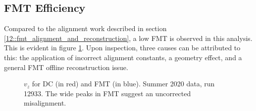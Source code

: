 \subsection{FMT Efficiency}
\label{14.10::fmt_efficiency}
    Compared to the alignment work described in section \ref{12::fmt_alignment_and_reconstruction}, a low FMT is observed in this analysis.
    This is evident in figure \ref{fig::14.10::vz_012933}.
    Upon inspection, three causes can be attributed to this: the application of incorrect alignment constants, a geometry effect, and a general FMT offline reconstruction issue.

    \begin{figure}[b!]
        \centering{}
        \caption[$v_z$ for DC and FMT, run 12933]{$v_z$ for DC (in red) and FMT (in blue). Summer 2020 data, run 12933. The wide peaks in FMT suggest an uncorrected misalignment.}
        \label{fig::14.10::vz_012933}
    \end{figure}

    
    
    
    
